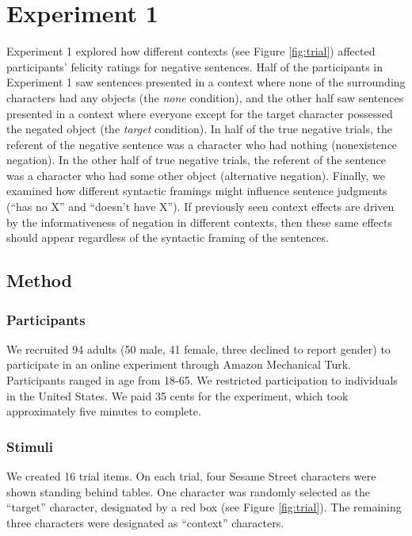 \documentclass[10pt,letterpaper]{article}
\begin{document}
\section{Experiment 1}

Experiment 1 explored how different contexts (see Figure \ref{fig:trial}) affected participants' felicity ratings for negative sentences.  Half of the participants in Experiment 1 saw sentences presented in a context where none of the surrounding characters had any objects (the \emph{none} condition), and the other half saw sentences presented in a context where everyone except for the target character possessed the negated object (the \emph{target} condition).  In half of the true negative trials, the referent of the negative sentence was a character who had nothing (nonexistence negation).  In the other half of true negative trials, the referent of the sentence was a character who had some other object (alternative negation).  Finally, we examined how different syntactic framings might influence sentence judgments (``has no X'' and ``doesn't have X''). If previously seen context effects are driven by the informativeness of negation in different contexts, then these same effects should appear regardless of the syntactic framing of the sentences.  

\subsection{Method}

\subsubsection{Participants}

We recruited 94 adults (50 male, 41 female, three declined to report gender) to participate in an online experiment through Amazon Mechanical Turk.  Participants ranged in age from 18-65.  We restricted participation to individuals in the United States. We paid 35 cents for the experiment, which took approximately five minutes to complete.  

\subsubsection{Stimuli}

We created 16 trial items. On each trial, four Sesame Street characters were shown standing behind tables.  One character was randomly selected as the ``target'' character, designated by a red box (see Figure \ref{fig:trial}). The remaining three characters were designated as ``context'' characters.
\end{document}
